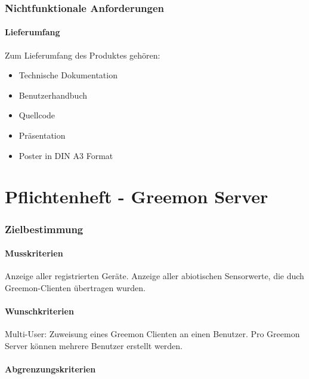 \documentclass[pointlessnumbers]{scrartcl}
\begin{document}
\section{Nichtfunktionale Anforderungen}
%
%

\subsection{Lieferumfang}
Zum Lieferumfang des Produktes gehören:
\begin{itemize}
    \item Technische Dokumentation
    \item Benutzerhandbuch
    \item Quellcode
    \item Präsentation
    \item Poster in DIN A3 Format 
\end{itemize}

%
%
%
%

\newpage
\part{Pflichtenheft - Greemon Server}
\newpage

\section{Zielbestimmung}
\subsection{Musskriterien}
Anzeige aller registrierten Geräte.
Anzeige aller abiotischen Sensorwerte, die duch Greemon-Clienten übertragen wurden.


%
%
\subsection{Wunschkriterien}
Multi-User: Zuweisung eines Greemon Clienten an einen Benutzer. Pro Greemon Server können mehrere Benutzer erstellt werden.
%
%
\subsection{Abgrenzungskriterien}
%
%

\end{document}
